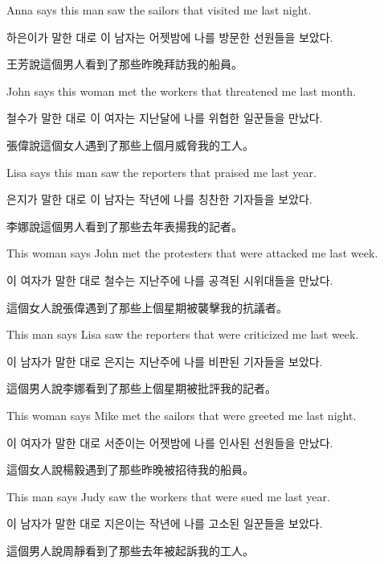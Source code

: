 \pex %
\a[label=E] Anna says this man saw the sailors that visited me last night.\par\nobreak
\a[label=K] \ko 하은이가 말한 대로 이 남자는 어젯밤에 나를 방문한 선원들을 보았다\normalfont.\par\nobreak
\a[label=M] \zh 王芳說這個男人看到了那些昨晚拜訪我的船員。\normalfont
\xe

\pex %
\a[label=E] John says this woman met the workers that threatened me last month.\par\nobreak
\a[label=K] \ko 철수가 말한 대로 이 여자는 지난달에 나를 위협한 일꾼들을 만났다\normalfont.\par\nobreak
\a[label=M] \zh 張偉說這個女人遇到了那些上個月威脅我的工人。\normalfont
\xe

\pex %
\a[label=E] Lisa says this man saw the reporters that praised me last year.\par\nobreak
\a[label=K] \ko 은지가 말한 대로 이 남자는 작년에 나를 칭찬한 기자들을 보았다\normalfont.\par\nobreak
\a[label=M] \zh 李娜說這個男人看到了那些去年表揚我的記者。\normalfont
\xe

\pex %
\a[label=E] \ljudge{*}This woman says John met the protesters that were attacked me last week.\par\nobreak
\a[label=K] \ljudge{*} \ko 이 여자가 말한 대로 철수는 지난주에 나를 공격된 시위대들을 만났다\normalfont.\par\nobreak
\a[label=M] \ljudge{*} \zh 這個女人說張偉遇到了那些上個星期被襲擊我的抗議者。\normalfont
\xe

\pex %
\a[label=E] \ljudge{*}This man says Lisa saw the reporters that were criticized me last week.\par\nobreak
\a[label=K] \ljudge{*}\ko 이 남자가 말한 대로 은지는 지난주에 나를 비판된 기자들을 보았다\normalfont.\par\nobreak
\a[label=M] \ljudge{*}\zh 這個男人說李娜看到了那些上個星期被批評我的記者。\normalfont
\xe

\pex %
\a[label=E] \ljudge{*}This woman says Mike met the sailors that were greeted me last night.\par\nobreak
\a[label=K] \ljudge{*}\ko 이 여자가 말한 대로 서준이는 어젯밤에 나를 인사된 선원들을 만났다\normalfont.\par\nobreak
\a[label=M] \ljudge{*}\zh 這個女人說楊毅遇到了那些昨晚被招待我的船員。\normalfont
\xe

\pex %
\a[label=E] \ljudge{*}This man says Judy saw the workers that were sued me last year.\par\nobreak
\a[label=K] \ljudge{*}\ko 이 남자가 말한 대로 지은이는 작년에 나를 고소된 일꾼들을 보았다\normalfont.\par\nobreak
\a[label=M] \ljudge{*}\zh 這個男人說周靜看到了那些去年被起訴我的工人。\normalfont
\xe

